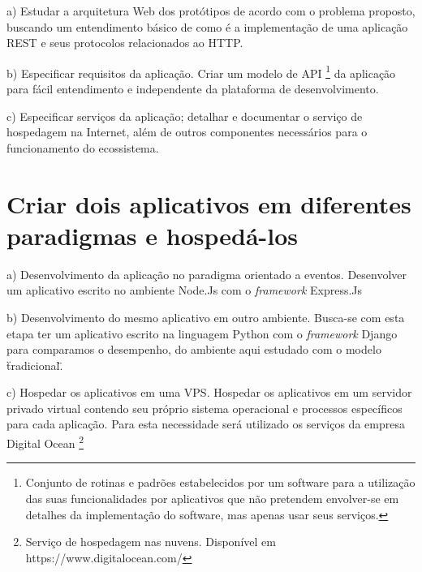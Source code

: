   \begin{compactitem}
    \item[a)] Estudar a arquitetura Web dos protótipos de acordo com o problema proposto, buscando um entendimento 
    básico de como é a implementação de uma aplicação \ac{REST} e seus protocolos relacionados ao HTTP.
    
    \item[b)] Especificar requisitos da aplicação. Criar um modelo de API 
    \footnote[5]{Conjunto de rotinas e padrões estabelecidos por um software para a utilização das suas funcionalidades por
    aplicativos que não pretendem envolver-se em detalhes da implementação do software, mas apenas usar seus serviços.} 
    da aplicação para fácil entendimento e independente da plataforma de desenvolvimento.
    
    \item[c)] Especificar serviços da aplicação; detalhar e documentar o serviço de hospedagem na Internet, além de outros componentes 
    necessários para o funcionamento do ecossistema.
      
  \end{compactitem}

\section{Criar dois aplicativos em diferentes paradigmas e hospedá-los}
  
  \begin{compactitem}
    \item[a)] Desenvolvimento da aplicação no paradigma orientado a eventos. Desenvolver um aplicativo escrito no
    ambiente Node.Js com o \textit{framework} Express.Js
    
    \item[b)] Desenvolvimento do mesmo aplicativo em outro ambiente. Busca-se com esta etapa ter 
    um aplicativo escrito na linguagem Python com o \textit{framework} Django para comparamos o desempenho, 
    do ambiente aqui estudado com o modelo \"tradicional\".
    
    \item[c)] Hospedar os aplicativos em uma \ac{VPS}.  Hospedar os aplicativos em um 
    servidor privado virtual contendo seu próprio sistema operacional e processos
    específicos para cada aplicação. Para esta necessidade será utilizado os serviços da empresa Digital Ocean \footnote[6]{
    Serviço de hospedagem nas nuvens. Disponível em https://www.digitalocean.com/}
    
  \end{compactitem}

